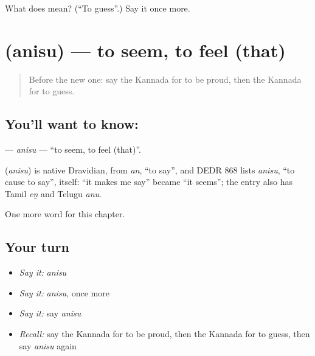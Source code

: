 \begin{tcolorbox}[breakable,colback=teal!4,colframe=teal!35!black,title={Before you move on}]
What does  mean? (\textquotedblleft{}To guess\textquotedblright{}.) Say it once more.
\end{tcolorbox}
\section[\texorpdfstring{\kn{ಅನಿಸು} (anisu)}{ಅನಿಸು (anisu)}]{ (anisu) — to seem, to feel (that)}

\label{lesson:KA-C277-anisu}



\begin{quote}
Before the new one: say the Kannada for to be proud, then the Kannada for to guess.
\end{quote}

\subsection*{You'll want to know: }
\textbf{} — \emph{anisu} — \textquotedblleft{}to seem, to feel (that)\textquotedblright{}.

\begin{cousinweb}
\textbf{} (\emph{anisu}) is native Dravidian, from \emph{an}, \textquotedblleft{}to say\textquotedblright{}, and DEDR 868 lists \emph{anisu}, \textquotedblleft{}to cause to say\textquotedblright{}, itself: \textquotedblleft{}it makes me say\textquotedblright{} became \textquotedblleft{}it seems\textquotedblright{}; the entry also has Tamil \emph{eṉ} and Telugu \emph{anu}.
\end{cousinweb}

\begin{grammarlens}[title={What you've built}]
One more word for this chapter.
\end{grammarlens}

\subsection*{Your turn}
\begin{itemize}
\raggedright
  \item \emph{Say it:} \emph{anisu}
  \item \emph{Say it:} \emph{anisu}, once more
  \item \emph{Say it:} say \emph{anisu}
  \item \emph{Recall:} say the Kannada for to be proud, then the Kannada for to guess, then say \emph{anisu} again
\end{itemize}

